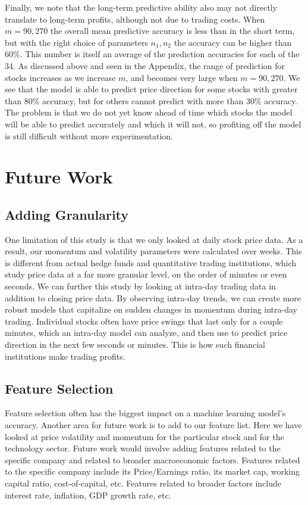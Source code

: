 \documentclass[pageno]{jpaper}
\begin{document}
Finally, we note that the long-term predictive ability also may not directly translate to long-term profits, although not due to trading costs. When $m=90, 270$ the overall mean predictive accuracy is less than in the short term, but with the right choice of parameters $n_1, n_2$ the accuracy can be higher than 60\%. This number is itself an average of the prediction accuracies for each of the 34. As discussed above and seen in the Appendix, the range of prediction for stocks increases as we increase $m$, and becomes very large when $m=90, 270$. We see that the model is able to predict price direction for some stocks with greater than 80\% accuracy, but for others cannot predict with more than 30\% accuracy. The problem is that we do not yet know ahead of time which stocks the model will be able to predict accurately and which it will not, so profiting off the model is still difficult without more experimentation.

\section{Future Work}
\subsection{Adding Granularity}
One limitation of this study is that we only looked at daily stock price data. As a result, our momentum and volatility parameters were calculated over weeks. This is different from actual hedge funds and quantitative trading institutions, which study price data at a far more granular level, on the order of minutes or even seconds. We can further this study by looking at intra-day trading data in addition to closing price data. By observing intra-day trends, we can create more robust models that capitalize on sudden changes in momentum during intra-day trading. Individual stocks often have price swings that last only for a couple minutes, which an intra-day model can analyze, and then use to predict price direction in the next few seconds or minutes. This is how such financial institutions make trading profits.

\subsection{Feature Selection}
Feature selection often has the biggest impact on a machine learning model’s accuracy. Another area for future work is to add to our feature list. Here we have looked at price volatility and momentum for the particular stock and for the technology sector. Future work would involve adding features related to the specific company and related to broader macroeconomic factors. Features related to the specific company include its Price/Earnings ratio, its market cap, working capital ratio, cost-of-capital, etc. Features related to broader factors include interest rate, inflation, GDP growth rate, etc.
\end{document}
